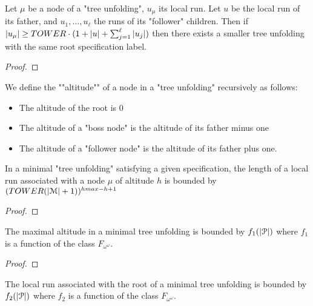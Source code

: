 \begin{lemma}
	Let $\mu$ be a node of a "tree unfolding", $u_\mu$ its local run.
	Let $u$ be the local run of its father, and $u_1, \ldots, u_\ell$ the runs of its "follower" children.
	Then if $|u_\mu| \geq TOWER \cdot (1+ |u|+ \sum_{j=1}^{\ell} |u_j|)$ then there exists a smaller tree unfolding with the same root specification label.
\end{lemma}

\begin{proof}
\end{proof}

\begin{definition}
	We define the ""altitude"" of a node in a "tree unfolding" recursively as follows:
	\begin{itemize}
		\item The altitude of the root is $0$
		
		\item The altitude of a "boss node" is the altitude of its father minus one
		
		\item The altitude of a "follower node" is the altitude of its father plus one.
	\end{itemize}
\end{definition}

\begin{lemma}
	\label{lem:bound-length-at-height-h}
	In a minimal "tree unfolding" satisfying a given specification, the length of a local run associated with a node $\mu$ of altitude $h$ is bounded by $(TOWER (|\mathcal{M}|+1))^{hmax-h+1}$
\end{lemma}

\begin{proof}
\end{proof}

\begin{lemma}
	\label{lem:bound-max-height}
	The maximal altitude in a minimal tree unfolding is bounded by $f_1(|\mathcal{P}|)$ where $f_1$ is a function of the class $F_{\omega^\omega}$.
\end{lemma}

\begin{proof}
\end{proof}

\begin{corollary}
	The local run associated with the root of a minimal tree unfolding is bounded by $f_2(|\mathcal{P}|)$ where $f_2$ is a function of the class $F_{\omega^\omega}$.
\end{corollary}

